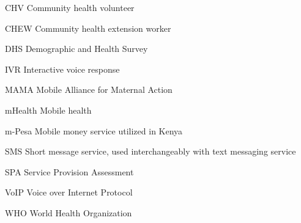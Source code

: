 \abbreviations


%
%
%
%

\begin{symbollist}
	\item[CHV] Community health volunteer
	\item[CHEW] Community health extension worker
	\item[DHS] Demographic and Health Survey
	\item[IVR] Interactive voice response
	\item[MAMA] Mobile Alliance for Maternal Action
	\item[mHealth] Mobile health
	\item[m-Pesa] Mobile money service utilized in Kenya
	\item[SMS] Short message service, used interchangeably with text messaging service
	\item[SPA] Service Provision Assessment
	\item[VoIP] Voice over Internet Protocol
	\item[WHO] World Health Organization
\end{symbollist}
